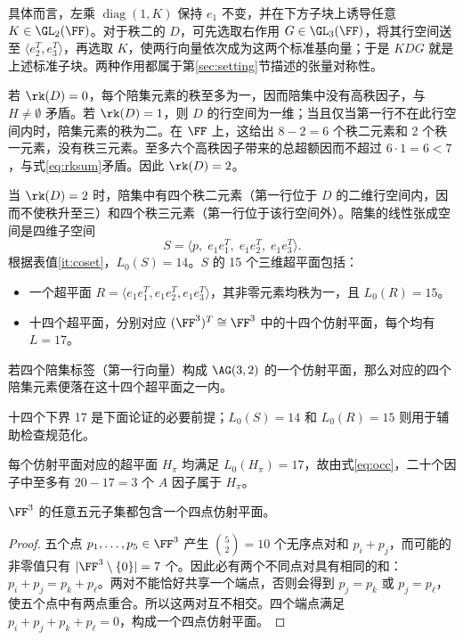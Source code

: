 \documentclass[11pt,a4paper]{article}
\begin{document}
具体而言，左乘 $\operatorname{diag}(1,K)$ 保持 $e_1$ 不变，并在下方子块上诱导任意 $K\in\GL_2(\FF)$。对于秩二的 $D$，可先选取右作用 $G\in\GL_3(\FF)$，将其行空间送至 $\langle e_2^T,e_3^T\rangle$，再选取 $K$，使两行向量依次成为这两个标准基向量；于是 $KDG$ 就是上述标准子块。两种作用都属于第\ref{sec:setting}节描述的张量对称性。

若 $\rk(D)=0$，每个陪集元素的秩至多为一，因而陪集中没有高秩因子，与 $H\ne\emptyset$ 矛盾。若 $\rk(D)=1$，则 $D$ 的行空间为一维；当且仅当第一行不在此行空间内时，陪集元素的秩为二。在 $\FF$ 上，这给出 $8-2=6$ 个秩二元素和 2 个秩一元素，没有秩三元素。至多六个高秩因子带来的总超额因而不超过 $6\cdot1=6<7$，与式\eqref{eq:rksum}矛盾。因此 $\rk(D)=2$。

当 $\rk(D)=2$ 时，陪集中有四个秩二元素（第一行位于 $D$ 的二维行空间内，因而不使秩升至三）和四个秩三元素（第一行位于该行空间外）。陪集的线性张成空间是四维子空间
\[
  S = \langle p,\; e_1e_1^T,\; e_1e_2^T,\; e_1e_3^T\rangle.
\]
根据表值\ref{it:coset}，$L_0(S)=14$。$S$ 的 15 个三维超平面包括：
\begin{itemize}
  \item 一个超平面 $R=\langle e_1e_1^T,e_1e_2^T,e_1e_3^T\rangle$，其非零元素均秩为一，且 $L_0(R)=15$。
  \item 十四个超平面，分别对应 $(\FF^3)^T\cong\FF^3$ 中的十四个仿射平面，每个均有 $L=17$。
\end{itemize}
若四个陪集标签（第一行向量）构成 $\AG(3,2)$ 的一个仿射平面，那么对应的四个陪集元素便落在这十四个超平面之一内。

十四个下界 17 是下面论证的必要前提；$L_0(S)=14$ 和 $L_0(R)=15$ 则用于辅助检查规范化。

每个仿射平面对应的超平面 $H_\pi$ 均满足 $L_0(H_\pi)=17$，故由式\eqref{eq:occ}，二十个因子中至多有 $20-17=3$ 个 $A$ 因子属于 $H_\pi$。

\begin{lemma}[点集容量界]\label{lem:cap}
  $\FF^3$ 的任意五元子集都包含一个四点仿射平面。
\end{lemma}

\begin{proof}
  五个点 $p_1,\ldots,p_5\in\FF^3$ 产生 $\binom{5}{2}=10$ 个无序点对和 $p_i+p_j$，而可能的非零值只有 $|\FF^3\setminus\{0\}|=7$ 个。因此必有两个不同点对具有相同的和：$p_i+p_j=p_k+p_\ell$。两对不能恰好共享一个端点，否则会得到 $p_j=p_k$ 或 $p_j=p_\ell$，使五个点中有两点重合。所以这两对互不相交。四个端点满足 $p_i+p_j+p_k+p_\ell=0$，构成一个四点仿射平面。
\end{proof}
\end{document}
